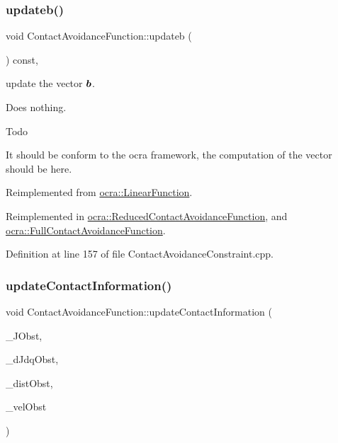 \subsubsection{\texorpdfstring{updateb()}{updateb()}}
{\footnotesize\ttfamily void Contact\+Avoidance\+Function\+::updateb (\begin{DoxyParamCaption}{ }\end{DoxyParamCaption}) const\hspace{0.3cm}{\ttfamily [protected]}, {\ttfamily [virtual]}}

update the vector $ \mbox{\boldmath${b}$} $.

Does nothing.

\begin{DoxyRefDesc}{Todo}
\item[\hyperlink{todo__todo000002}{Todo}]It should be conform to the ocra framework, the computation of the vector should be here. \end{DoxyRefDesc}


Reimplemented from \hyperlink{classocra_1_1LinearFunction_a546454cd8d0909f99433ffc0e700c9e3}{ocra\+::\+Linear\+Function}.



Reimplemented in \hyperlink{classocra_1_1ReducedContactAvoidanceFunction_ac39227a19a650de28f4ae603511bfb73}{ocra\+::\+Reduced\+Contact\+Avoidance\+Function}, and \hyperlink{classocra_1_1FullContactAvoidanceFunction_ae24690ecd464eefd43936907e33c4cb9}{ocra\+::\+Full\+Contact\+Avoidance\+Function}.



Definition at line 157 of file Contact\+Avoidance\+Constraint.\+cpp.

\hypertarget{classocra_1_1ContactAvoidanceFunction_aee28a7fe69481db190d2e26b603659ea}{}\label{classocra_1_1ContactAvoidanceFunction_aee28a7fe69481db190d2e26b603659ea} 
\subsubsection{\texorpdfstring{update\+Contact\+Information()}{updateContactInformation()}}
{\footnotesize\ttfamily void Contact\+Avoidance\+Function\+::update\+Contact\+Information (\begin{DoxyParamCaption}\item[{const Eigen\+::\+Matrix\+Xd \&}]{\+\_\+\+J\+Obst,  }\item[{const Eigen\+::\+Vector\+Xd \&}]{\+\_\+d\+Jdq\+Obst,  }\item[{const Eigen\+::\+Vector\+Xd \&}]{\+\_\+dist\+Obst,  }\item[{const Eigen\+::\+Vector\+Xd \&}]{\+\_\+vel\+Obst }\end{DoxyParamCaption})}

